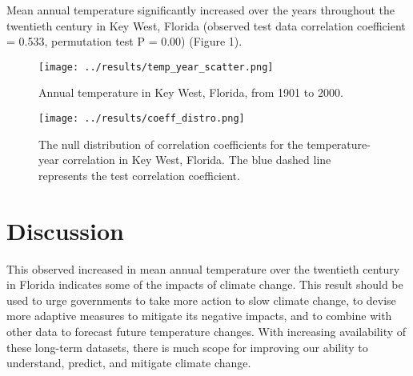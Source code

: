 \documentclass{article}
\begin{document}
	Mean annual temperature significantly increased over the years throughout the twentieth century in Key West, Florida (observed test data correlation coefficient = 0.533, permutation test P = 0.00) (Figure 1). \vspace{-0.5em}
	
	\begin{figure}[htbp]
		\centering
		\begin{minipage}{.5\textwidth}
			\centering
			\texttt{[image: ../results/temp\_year\_scatter.png]}
			\caption{Annual temperature in Key West, Florida, \newline from 1901 to 2000.}
			\label{fig.test1}
		\end{minipage}%
		\begin{minipage}{.5\textwidth}
			\centering
			\texttt{[image: ../results/coeff\_distro.png]}
			\caption{The null distribution of correlation coefficients for the temperature-year correlation in Key West, Florida. The blue dashed line represents the test correlation coefficient.}
			\label{fig:test2}
		\end{minipage}
	\end{figure}\vspace{-1.5em}
	
	\section{Discussion \vspace{-0.5em}}
	
	This observed increased in mean annual temperature over the twentieth century in Florida indicates some of the impacts of climate change. This result should be used to urge governments to take more action to slow climate change, to devise more adaptive measures to mitigate its negative impacts, and to combine with other data to forecast future temperature changes. With increasing availability of these long-term datasets, there is much scope for improving our ability to understand, predict, and mitigate climate change. \vspace{-1em}
	
	\printbibliography
	
	
\end{document}
